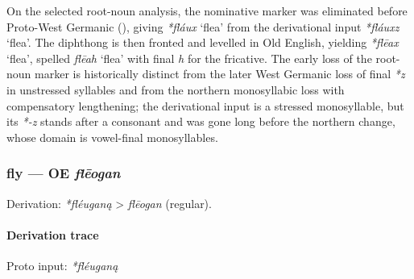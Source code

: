 \documentclass[
  british,
  a4paper,
]{article}
\providecommand{\Recon}[1]{\emph{*#1}}
\begin{document}
On the selected root-noun analysis, the nominative marker was eliminated
before Proto-West Germanic (), giving \Recon{fláux} `flea' from the derivational
input \Recon{fláuxz} `flea'. The diphthong is then fronted and levelled
in Old English, yielding \Recon{flēax} `flea', spelled \emph{flēah}
`flea' with final \emph{h} for the fricative. The early loss of the
root-noun marker is historically distinct from the later West Germanic
loss of final \emph{*z} in unstressed syllables and from the northern
monosyllabic loss with compensatory lengthening; the derivational input
is a stressed monosyllable, but its \emph{*-z} stands after a consonant
and was gone long before the northern change, whose domain is
vowel-final monosyllables.

\subsubsection{\texorpdfstring{fly --- OE
\emph{flēogan}}{fly --- OE flēogan}}\label{fly-oe-flux113ogan}

Derivation: \emph{*fléuganą} \textgreater{} \emph{flēogan} (regular).

\paragraph{Derivation trace}\label{derivation-trace-27}

Proto input: \emph{*fléuganą}

\begingroup
\setlength{\fboxsep}{6pt}
\end{document}
